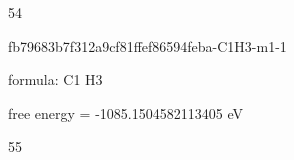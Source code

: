 \documentclass{article}
\begin{document}
54

\vspace{1cm}


fb79683b7f312a9cf81ffef86594feba-C1H3-m1-1



formula: C1 H3



free energy = -1085.1504582113405 eV

55
\end{document}
